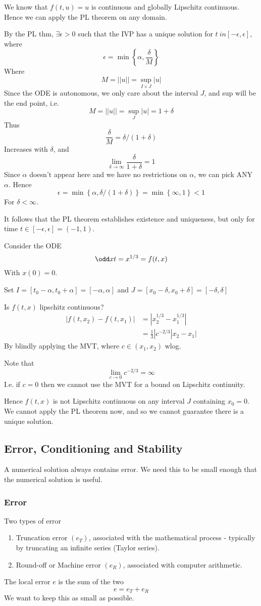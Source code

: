 \documentclass{X:/Documents/Coding/Latex/myassignment}
\begin{document}
We know that $f(t,u) = u$ is continuous and globally Lipschitz continuous. Hence we can apply the PL theorem on any domain.

By the PL thm, $\exists \epsilon > 0$ such that the IVP has a unique solution for $t \ in [-\epsilon,\epsilon]$, where
\[\epsilon = \min\left\{\alpha,\frac \delta M\right\}\] 
Where 
\[M = ||u|| = \sup_{I\times J} |u|\]
Since the ODE is autonomous, we only care about the interval $J$, and sup will be the end point, i.e.
\[M = ||u|| = \sup_{J} |u| = 1+\delta\]
Thus 
\[\frac \delta M = \delta/(1+\delta)\]
Increases with $\delta$, and
\[\lim_{\delta\to\infty} \frac{\delta}{1+\delta} = 1\]
Since $\alpha$ doesn't appear here and we have no restrictions on $\alpha$, we can pick ANY $\alpha$. Hence
\[\epsilon = \min\left\{\alpha,\delta/(1+\delta)\right\} = \min\left\{\infty, 1\right\} < 1\]
For $\delta < \infty$.

It follows that the PL theorem establishes existence and uniqueness, but only for time $t \in [-\epsilon,\epsilon] = (-1,1)$.


Consider the ODE
\[\odd xt = x^{1/3} = f(t,x)\]
With $x(0) = 0$.

Set $I = \left[t_0 - \alpha,t_0+\alpha\right] = \left[-\alpha,\alpha\right]$ and $J = \left[x_0- \delta, x_0 + \delta\right] = \left[-\delta,\delta\right]$

Is $f(t,x)$ lipschitz continuous?
\begin{align*}
    |f(t,x_2) - f(t,x_1)| &= |x_2^{1/3} - x_1^{1/3}|\\
    &= \frac13|c^{-2/3} |x_2 -x_1|
\end{align*}
By blindly applying the MVT, where $c \in \left(x_1,x_2\right)$ wlog.

Note that 
\[\lim_{c\to 0 } c^{-2/3}  = \infty\]
I.e. if $c = 0$ then we cannot use the MVT for a bound on Lipschitz continuity.

Hence $f(t,x)$ is not Lipschitz continuous on any interval $J$ containing $x_0 = 0$. We cannot apply the PL theorem now, and so we cannot guarantee there is a unique solution.


\subsection{Error, Conditioning and Stability}
A numerical solution always contains error. We need this to be small enough that the numerical solution is useful.
\subsubsection{Error}
Two types of error
\begin{enumerate}
    \item Truncation error $(e_T)$, associated with the mathematical process - typically by truncating an infinite series (Taylor series).
    \item Round-off or Machine error $(e_R)$, associated with computer arithmetic.
\end{enumerate}
The local error $e$ is the sum of the two
\[e = e_T + e_R\]
We want to keep this as small as possible.
\end{document}
